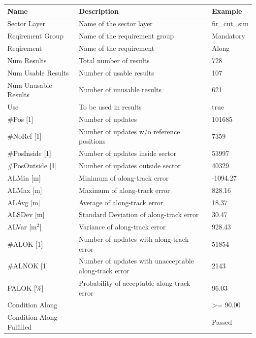 \begin{center}
 \begin{table}[H]
  \begin{tabularx}{\textwidth}{ | l | X |  l | }
    \hline
    \textbf{Name} & \textbf{Description} & \textbf{Example} \\ \hline
    Sector Layer & Name of the sector layer & fir\_cut\_sim \\ \hline
    Reqirement Group & Name of the requirement group & Mandatory \\ \hline
    Reqirement & Name of the requirement & Along \\ \hline
    Num Results & Total number of results & 728 \\ \hline
    Num Usable Results & Number of usable results & 107 \\ \hline
    Num Unusable Results & Number of unusable results & 621 \\ \hline
    Use & To be used in results & true \\ \hline
    \#Pos [1] & Number of updates & 101685 \\ \hline
    \#NoRef [1] & Number of updates w/o reference positions & 7359 \\ \hline
    \#PosInside [1] & Number of updates inside sector & 53997 \\ \hline
    \#PosOutside [1] & Number of updates outside sector & 40329 \\ \hline
    ALMin [m] & Minimum of along-track error & -1094.27 \\ \hline
    ALMax [m] & Maximum of along-track error & 828.16 \\ \hline
    ALAvg [m] & Average of along-track error & 18.37 \\ \hline
    ALSDev [m] & Standard Deviation of along-track error & 30.47 \\ \hline
    ALVar [m$^2$] & Variance of along-track error & 928.43 \\ \hline
    \#ALOK [1] & Number of updates with along-track error & 51854 \\ \hline
    \#ALNOK [1] & Number of updates with unacceptable along-track error  & 2143 \\ \hline
    PALOK [\%] & Probability of acceptable along-track error & 96.03 \\ \hline
    Condition Along &  & >= 90.00 \\ \hline
    Condition Along Fulfilled &  & Passed \\ \hline
\end{tabularx}
\end{table}
\end{center}

